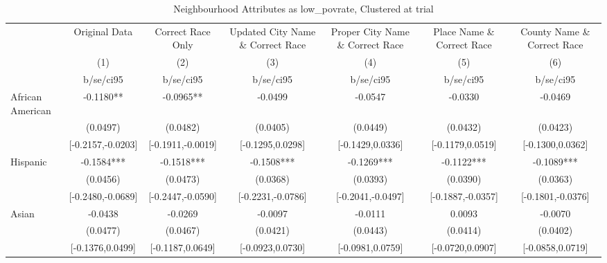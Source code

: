 \documentclass{article}
\begin{document}
\begin{table}[htbp]\centering
\def\sym#1{\ifmmode^{#1}\else\(^{#1}\)\fi}
\caption{Neighbourhood Attributes as low\_povrate, Clustered at trial}
\begin{tabular}{l*{6}{c}}
\toprule
                    &\multicolumn{1}{c}{Original Data}&\multicolumn{1}{c}{Correct Race Only}&\multicolumn{1}{c}{Updated City Name \& Correct Race}&\multicolumn{1}{c}{Proper City Name \& Correct Race}&\multicolumn{1}{c}{Place Name \& Correct Race}&\multicolumn{1}{c}{County Name \& Correct Race}\\\cmidrule(lr){2-2}\cmidrule(lr){3-3}\cmidrule(lr){4-4}\cmidrule(lr){5-5}\cmidrule(lr){6-6}\cmidrule(lr){7-7}
                    &\multicolumn{1}{c}{(1)}   &\multicolumn{1}{c}{(2)}   &\multicolumn{1}{c}{(3)}   &\multicolumn{1}{c}{(4)}   &\multicolumn{1}{c}{(5)}   &\multicolumn{1}{c}{(6)}   \\
                    &   b/se/ci95   &   b/se/ci95   &   b/se/ci95   &   b/se/ci95   &   b/se/ci95   &   b/se/ci95   \\
\midrule
African American    &     -0.1180** &     -0.0965** &     -0.0499   &     -0.0547   &     -0.0330   &     -0.0469   \\
                    &    (0.0497)   &    (0.0482)   &    (0.0405)   &    (0.0449)   &    (0.0432)   &    (0.0423)   \\
                    &[-0.2157,-0.0203]   &[-0.1911,-0.0019]   &[-0.1295,0.0298]   &[-0.1429,0.0336]   &[-0.1179,0.0519]   &[-0.1300,0.0362]   \\
Hispanic            &     -0.1584***&     -0.1518***&     -0.1508***&     -0.1269***&     -0.1122***&     -0.1089***\\
                    &    (0.0456)   &    (0.0473)   &    (0.0368)   &    (0.0393)   &    (0.0390)   &    (0.0363)   \\
                    &[-0.2480,-0.0689]   &[-0.2447,-0.0590]   &[-0.2231,-0.0786]   &[-0.2041,-0.0497]   &[-0.1887,-0.0357]   &[-0.1801,-0.0376]   \\
Asian               &     -0.0438   &     -0.0269   &     -0.0097   &     -0.0111   &      0.0093   &     -0.0070   \\
                    &    (0.0477)   &    (0.0467)   &    (0.0421)   &    (0.0443)   &    (0.0414)   &    (0.0402)   \\
                    &[-0.1376,0.0499]   &[-0.1187,0.0649]   &[-0.0923,0.0730]   &[-0.0981,0.0759]   &[-0.0720,0.0907]   &[-0.0858,0.0719]   \\

\end{tabular}
\end{table}
\end{document}
